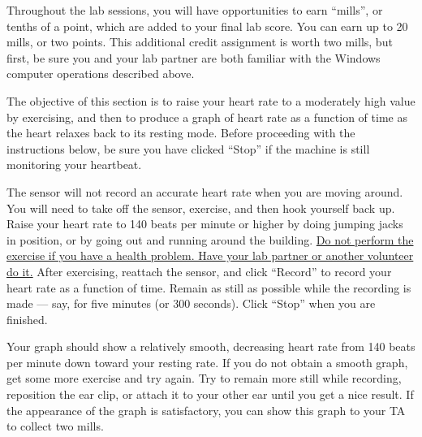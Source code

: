 Throughout the lab sessions, you will have opportunities to earn ``mills'', or tenths of a point, which are added to your final lab score.  You can earn up to 20 mills, or two points.  This additional credit assignment is worth two mills, but first, be sure you and your lab partner are both familiar with the Windows computer operations described above.

The objective of this section is to raise your heart rate to a moderately high value by exercising, and then to produce a graph of heart rate as a function of time as the heart relaxes back to its resting mode.  Before proceeding with the instructions below, be sure you have clicked ``Stop'' if the machine is still monitoring your heartbeat.

The sensor will not record an accurate heart rate when you are moving around.  You will need to take off the sensor, exercise, and then hook yourself back up.  Raise your heart rate to 140 beats per minute or higher by doing jumping jacks in position, or by going out and running around the building.  \ul{Do not perform the exercise if you have a health problem.  Have your lab partner or another volunteer do it.}  After exercising, reattach the sensor, and click ``Record'' to record your heart rate as a function of time.  Remain as still as possible while the recording is made --- say, for five minutes (or 300 seconds).  Click ``Stop'' when you are finished.

Your graph should show a relatively smooth, decreasing heart rate from 140 beats per minute down toward your resting rate.  If you do not obtain a smooth graph, get some more exercise and try again.  Try to remain more still while recording, reposition the ear clip, or attach it to your other ear until you get a nice result.  If the appearance of the graph is satisfactory, you can show this graph to your TA to collect two mills.

